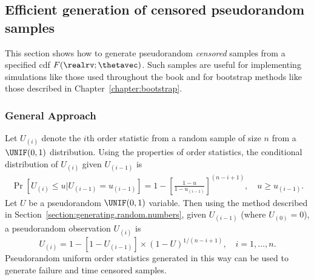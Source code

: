 \subsection{Efficient generation of  censored pseudorandom samples}
\label{section:pseudo.random.censored}
This section shows how to generate pseudorandom {\em censored} samples
from a specified cdf $F(\realrv; \thetavec)$.  Such samples are
useful for implementing simulations like those used throughout the
book and for bootstrap methods like those described in
Chapter~\ref{chapter:bootstrap}.
\subsubsection{General Approach}
Let $U_{(i)}$ denote the $i$th order statistic from a random sample
of size $n$ from a $\UNIF(0,1)$ distribution.  Using the properties of
order statistics, the conditional distribution of $U_{(i)}$ given
$U_{(i-1)}$ is
\begin{eqnarray*}
\Pr  \left [ U_{(i)}\leq u|U_{(i-1)}=u_{(i-1)}\right ]=1 -
\left [\frac{1-u } { 1-u_{(i-1)} }
\right ]^{(n-i+1)}, \quad u \ge u_{(i-1)}.
\end{eqnarray*}
Let $U$ be a pseudorandom $\UNIF(0,1)$ variable.  Then using the method
described in Section~\ref{section:generating.random.numbers}, given
$U_{(i-1)}$ (where $U_{(0)} =  0$), a pseudorandom observation
$U_{(i)}$ is
\begin{displaymath}
U_{(i)}=1-[1-U_{(i-1)}] \times \left (1 - U \right )^{1/(n-i+1)}, 
\quad i=1,\dots, n.
\end{displaymath}
Pseudorandom uniform order statistics generated in this way can be
used to generate failure and time censored samples.
